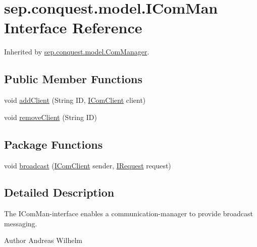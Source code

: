\hypertarget{interfacesep_1_1conquest_1_1model_1_1_i_com_man}{
\section{sep.conquest.model.IComMan Interface Reference}
\label{interfacesep_1_1conquest_1_1model_1_1_i_com_man}
}


Inherited by \hyperlink{classsep_1_1conquest_1_1model_1_1_com_manager}{sep.conquest.model.ComManager}.

\subsection*{Public Member Functions}
\begin{DoxyCompactItemize}
\item 
void \hyperlink{interfacesep_1_1conquest_1_1model_1_1_i_com_man_a7ef0cc971fee10900985553e260717eb}{addClient} (String ID, \hyperlink{interfacesep_1_1conquest_1_1model_1_1_i_com_client}{IComClient} client)
\item 
void \hyperlink{interfacesep_1_1conquest_1_1model_1_1_i_com_man_a275bd938fd5fde4cf99c302c5ae5b85b}{removeClient} (String ID)
\end{DoxyCompactItemize}
\subsection*{Package Functions}
\begin{DoxyCompactItemize}
\item 
void \hyperlink{interfacesep_1_1conquest_1_1model_1_1_i_com_man_a946a5a220a09cb25043dac290a1ecab4}{broadcast} (\hyperlink{interfacesep_1_1conquest_1_1model_1_1_i_com_client}{IComClient} sender, \hyperlink{interfacesep_1_1conquest_1_1model_1_1_i_request}{IRequest} request)
\end{DoxyCompactItemize}


\subsection{Detailed Description}
The IComMan-\/interface enables a communication-\/manager to provide broadcast messaging.

\begin{DoxyAuthor}{Author}
Andreas Wilhelm 
\end{DoxyAuthor}



